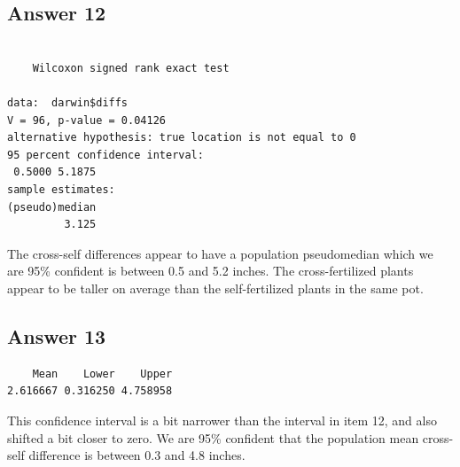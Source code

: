 \documentclass[
]{book}
\newenvironment{Shaded}{\begin{snugshade}}{\end{snugshade}}
\newcommand{\DataTypeTok}[1]{\textcolor[rgb]{0.13,0.29,0.53}{#1}}
\newcommand{\DecValTok}[1]{\textcolor[rgb]{0.00,0.00,0.81}{#1}}
\newcommand{\FloatTok}[1]{\textcolor[rgb]{0.00,0.00,0.81}{#1}}
\newcommand{\KeywordTok}[1]{\textcolor[rgb]{0.13,0.29,0.53}{\textbf{#1}}}
\newcommand{\NormalTok}[1]{#1}
\newcommand{\OperatorTok}[1]{\textcolor[rgb]{0.81,0.36,0.00}{\textbf{#1}}}
\newcommand{\OtherTok}[1]{\textcolor[rgb]{0.56,0.35,0.01}{#1}}
\begin{document}
\hypertarget{answer-12}{%
\subsection{Answer 12}\label{answer-12}}

\begin{Shaded}
\end{Shaded}

\begin{verbatim}

	Wilcoxon signed rank exact test

data:  darwin$diffs
V = 96, p-value = 0.04126
alternative hypothesis: true location is not equal to 0
95 percent confidence interval:
 0.5000 5.1875
sample estimates:
(pseudo)median 
         3.125 
\end{verbatim}

The cross-self differences appear to have a population pseudomedian which we are 95\% confident is between 0.5 and 5.2 inches. The cross-fertilized plants appear to be taller on average than the self-fertilized plants in the same pot.

\hypertarget{answer-13}{%
\subsection{Answer 13}\label{answer-13}}

\begin{Shaded}
\end{Shaded}

\begin{verbatim}
    Mean    Lower    Upper 
2.616667 0.316250 4.758958 
\end{verbatim}

This confidence interval is a bit narrower than the interval in item 12, and also shifted a bit closer to zero. We are 95\% confident that the population mean cross-self difference is between 0.3 and 4.8 inches.
\end{document}
